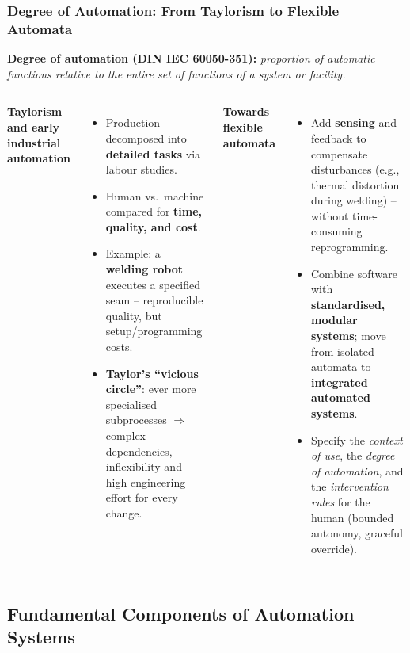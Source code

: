 \begin{frame}
	\frametitle{Degree of Automation: From Taylorism to Flexible Automata}
	\textbf{Degree of automation (DIN IEC 60050-351):} \emph{proportion of automatic functions relative to the entire set of functions of a system or facility.}\\[2mm]
	\small
	\begin{columns}[T,onlytextwidth]
		\textbf{Taylorism and early industrial automation}
		\begin{itemize}
			\item Production decomposed into \textbf{detailed tasks} via labour studies.
			\item Human vs.\ machine compared for \textbf{time, quality, and cost}.
			\item Example: a \textbf{welding robot} executes a specified seam -- reproducible quality, but setup/programming costs.
			\item \textbf{Taylor's ``vicious circle''}: ever more specialised subprocesses $\Rightarrow$ complex dependencies, inflexibility and high engineering effort for every change.
		\end{itemize}
		\textbf{Towards flexible automata}
		\begin{itemize}
			\item Add \textbf{sensing} and feedback to compensate disturbances (e.g., thermal distortion during welding) -- without time-consuming reprogramming.
			\item Combine software with \textbf{standardised, modular systems}; move from isolated automata to \textbf{integrated automated systems}.
			\item Specify the \emph{context of use}, the \emph{degree of automation}, and the \emph{intervention rules} for the human (bounded autonomy, graceful override).
		\end{itemize}
	\end{columns}
\end{frame}

\subsection{Fundamental Components of Automation Systems}

